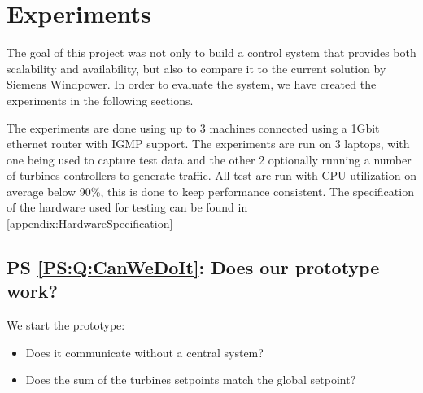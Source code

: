 
\chapter{Experiments}

\newcommand{\turbineNumbers}{(1, 5, 10 and 30)}


The goal of this project was not only to build a control system that provides both scalability and availability, but also to compare it to the current solution by Siemens Windpower. 
In order to evaluate the system, we have created the experiments in the following sections.

The experiments are done using up to 3 machines connected using a 1Gbit ethernet router with IGMP support.
The experiments are run on 3 laptops, with one being used to capture test data and the other 2 optionally running a number of turbines controllers to generate traffic.
All test are run with CPU utilization on average below 90\%, this is done to keep performance consistent.
The specification of the hardware used for testing can be found in \cref{appendix:HardwareSpecification}

\section{PS \ref{PS:Q:CanWeDoIt}: Does our prototype work?}
We start the prototype:
\begin{itemize}
	\item Does it communicate without a central system?
	\item Does the sum of the turbines setpoints match the global setpoint? 
\end{itemize}



